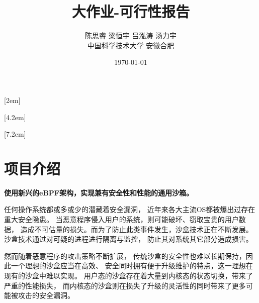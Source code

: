 \documentclass[AutoFakeBold,a4paper]{ctexart}
\begin{document}
\title{\textbf{\Huge 大作业-可行性报告}}

\author{陈思睿 \quad 梁恒宇 \quad 吕泓涛 \quad 汤力宇\\
中国科学技术大学 \quad 安徽合肥}

\date{\today}

\maketitle


[2em]{\addvspace{1.3mm}\bf}{%
\contentslabel{2.0em}}{}{\titlerule*[5pt]{$\cdot$}\contentspage}

[4.2em]{}{\contentslabel{2.5em}}{}{%
\titlerule*[5pt]{$\cdot$}\contentspage}

[7.2em]{}{\contentslabel{3.3em}}{}{%
\titlerule*[5pt]{$\cdot$}\contentspage}

\tableofcontents

\setcounter{page}{1}



\section{项目介绍}

\textbf{使用新兴的eBPF架构，实现兼有安全性和性能的通用沙箱。}

任何操作系统都或多或少的潜藏着安全漏洞，
近年来各大主流OS都被爆出过存在重大安全隐患。
当恶意程序侵入用户的系统，则可能破坏、窃取宝贵的用户数据，
造成不可估量的损失。而为了防止此类事件发生，沙盒技术正在不断发展。
沙盒技术通过对可疑的进程进行隔离与监控，
防止其对系统其它部分造成损害。

然而随着恶意程序的攻击策略不断扩展，
传统沙盒的安全性也难以长期保持，因此一个理想的沙盒应当在高效、
安全同时拥有便于升级维护的特点，这一理想在现有的沙盒中难以实现。
用户态的沙盒存在着大量到内核态的状态切换，带来了严重的性能损失，
而内核态的沙盒则在损失了升级的灵活性的同时带来了更多可能被攻击的安全漏洞。
\end{document}
